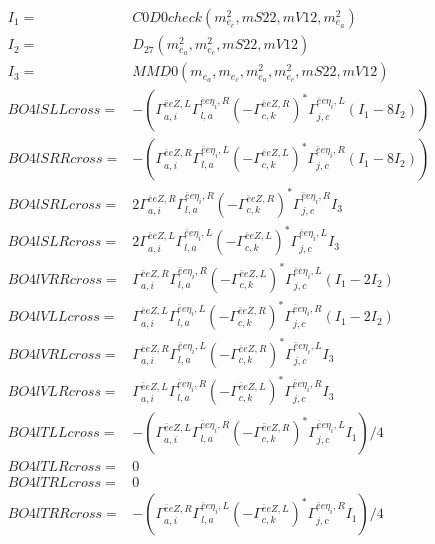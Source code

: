 \documentclass[A4,landscape]{article}
\begin{document}
\begin{align} 
I_1 = & C0D0check(m^2_{e_{{c}}}, mS22, mV12, m^2_{e_{{a}}}) \\ 
I_2 = & D_{27}(m^2_{e_{{a}}}, m^2_{e_{{c}}}, mS22, mV12) \\ 
I_3 = & MMD0(m_{e_{{a}}}, m_{e_{{c}}}, m^2_{e_{{a}}}, m^2_{e_{{c}}}, mS22, mV12) \\ 
  BO4lSLLcross= & -( \Gamma^{\bar{e}e Z ,L}_{a, i} \Gamma^{\bar{e}e \eta_i ,R}_{l, a} (- \Gamma^{\bar{e}e Z ,R} _{c, k})^* \Gamma^{\bar{e}e \eta_i ,L}_{j, c} (I_1 - 8 I_2)) \\ 
  BO4lSRRcross= & -( \Gamma^{\bar{e}e Z ,R}_{a, i} \Gamma^{\bar{e}e \eta_i ,L}_{l, a} (- \Gamma^{\bar{e}e Z ,L} _{c, k})^* \Gamma^{\bar{e}e \eta_i ,R}_{j, c} (I_1 - 8 I_2)) \\ 
  BO4lSRLcross= & 2  \Gamma^{\bar{e}e Z ,R}_{a, i} \Gamma^{\bar{e}e \eta_i ,R}_{l, a} (- \Gamma^{\bar{e}e Z ,R} _{c, k})^* \Gamma^{\bar{e}e \eta_i ,R}_{j, c} I_3 \\ 
  BO4lSLRcross= & 2  \Gamma^{\bar{e}e Z ,L}_{a, i} \Gamma^{\bar{e}e \eta_i ,L}_{l, a} (- \Gamma^{\bar{e}e Z ,L} _{c, k})^* \Gamma^{\bar{e}e \eta_i ,L}_{j, c} I_3 \\ 
  BO4lVRRcross= &  \Gamma^{\bar{e}e Z ,R}_{a, i} \Gamma^{\bar{e}e \eta_i ,R}_{l, a} (- \Gamma^{\bar{e}e Z ,L} _{c, k})^* \Gamma^{\bar{e}e \eta_i ,L}_{j, c} (I_1 - 2 I_2) \\ 
  BO4lVLLcross= &  \Gamma^{\bar{e}e Z ,L}_{a, i} \Gamma^{\bar{e}e \eta_i ,L}_{l, a} (- \Gamma^{\bar{e}e Z ,R} _{c, k})^* \Gamma^{\bar{e}e \eta_i ,R}_{j, c} (I_1 - 2 I_2) \\ 
  BO4lVRLcross= &  \Gamma^{\bar{e}e Z ,R}_{a, i} \Gamma^{\bar{e}e \eta_i ,L}_{l, a} (- \Gamma^{\bar{e}e Z ,R} _{c, k})^* \Gamma^{\bar{e}e \eta_i ,L}_{j, c} I_3 \\ 
  BO4lVLRcross= &  \Gamma^{\bar{e}e Z ,L}_{a, i} \Gamma^{\bar{e}e \eta_i ,R}_{l, a} (- \Gamma^{\bar{e}e Z ,L} _{c, k})^* \Gamma^{\bar{e}e \eta_i ,R}_{j, c} I_3 \\ 
  BO4lTLLcross= & -( \Gamma^{\bar{e}e Z ,L}_{a, i} \Gamma^{\bar{e}e \eta_i ,R}_{l, a} (- \Gamma^{\bar{e}e Z ,R} _{c, k})^* \Gamma^{\bar{e}e \eta_i ,L}_{j, c} I_1)/4 \\ 
  BO4lTLRcross= & 0 \\ 
  BO4lTRLcross= & 0 \\ 
  BO4lTRRcross= & -( \Gamma^{\bar{e}e Z ,R}_{a, i} \Gamma^{\bar{e}e \eta_i ,L}_{l, a} (- \Gamma^{\bar{e}e Z ,L} _{c, k})^* \Gamma^{\bar{e}e \eta_i ,R}_{j, c} I_1)/4 \\ 
\end{align} 
\end{document}
